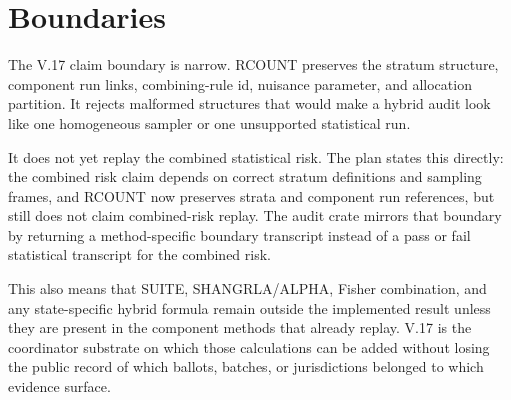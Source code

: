 \section{Boundaries}

The V.17 claim boundary is narrow. RCOUNT preserves the stratum structure,
component run links, combining-rule id, nuisance parameter, and allocation
partition. It rejects malformed structures that would make a hybrid audit look
like one homogeneous sampler or one unsupported statistical run.

It does not yet replay the combined statistical risk. The plan states this
directly: the combined risk claim depends on correct stratum definitions and
sampling frames, and RCOUNT now preserves strata and component run references,
but still does not claim combined-risk replay. The audit crate mirrors that
boundary by returning a method-specific boundary transcript instead of a pass
or fail statistical transcript for the combined risk.

This also means that SUITE, SHANGRLA/ALPHA, Fisher combination, and any
state-specific hybrid formula remain outside the implemented result unless
they are present in the component methods that already replay. V.17 is the
coordinator substrate on which those calculations can be added without losing
the public record of which ballots, batches, or jurisdictions belonged to
which evidence surface.
